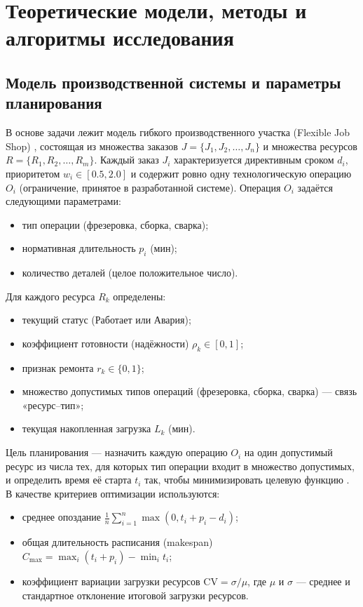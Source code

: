 \section{Теоретические модели, методы и алгоритмы исследования}

\subsection{Модель производственной системы и параметры планирования}

В основе задачи лежит модель гибкого производственного участка (Flexible Job Shop) \cite{machinostroy}, состоящая из множества заказов $J = \{J_1, J_2, \dots, J_n\}$ и множества ресурсов $R = \{R_1, R_2, \dots, R_m\}$. Каждый заказ $J_i$ характеризуется директивным сроком $d_i$, приоритетом $w_i \in [0.5, 2.0]$ и содержит ровно одну технологическую операцию $O_i$ (ограничение, принятое в разработанной системе). Операция $O_i$ задаётся следующими параметрами:

\begin{itemize}
    \item тип операции (фрезеровка, сборка, сварка);
    \item нормативная длительность $p_i$ (мин);
    \item количество деталей (целое положительное число).
\end{itemize}

Для каждого ресурса $R_k$ определены:

\begin{itemize}
    \item текущий статус (Работает или Авария);
    \item коэффициент готовности (надёжности) $\rho_k \in [0, 1]$;
    \item признак ремонта $r_k \in \{0, 1\}$;
    \item множество допустимых типов операций (фрезеровка, сборка, сварка) — связь «ресурс–тип»;
    \item текущая накопленная загрузка $L_k$ (мин).
\end{itemize}

Цель планирования — назначить каждую операцию $O_i$ на один допустимый ресурс из числа тех, для которых тип операции входит в множество допустимых, и определить время её старта $t_i$ так, чтобы минимизировать целевую функцию \cite{averch}. В качестве критериев оптимизации используются:

\begin{itemize}
    \item среднее опоздание $\frac{1}{n}\sum_{i=1}^n \max(0, t_i + p_i - d_i)$;
    \item общая длительность расписания (makespan) $C_{\max} = \max_i (t_i + p_i) - \min_i t_i$;
    \item коэффициент вариации загрузки ресурсов $\text{CV} = \sigma / \mu$, где $\mu$ и $\sigma$ — среднее и стандартное отклонение итоговой загрузки ресурсов.
\end{itemize}

